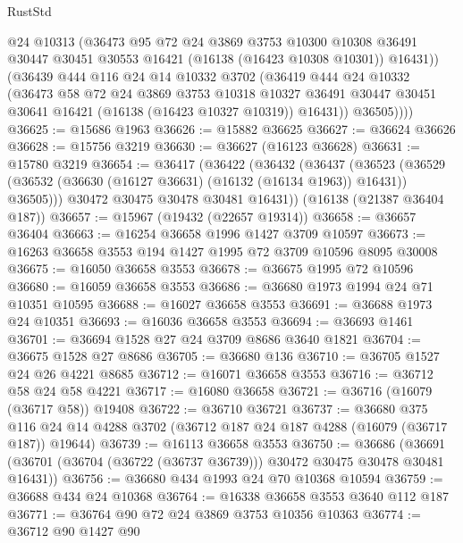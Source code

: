 \begin{lexlean}{RustStd}
\begin{coremodule}
            @24
            @10313
            (@36473
              @95
              @72
              @24
              @3869
              @3753
              @10300
              @10308
              @36491
              @30447
              @30451
              @30553
              @16421
              (@16138 (@16423 @10308 @10301))
              @16431))
          (@36439
            @444
            @116
            @24
            @14
            @10332
            @3702
            (@36419
              @444
              @24
              @10332
              (@36473
                @58
                @72
                @24
                @3869
                @3753
                @10318
                @10327
                @36491
                @30447
                @30451
                @30641
                @16421
                (@16138 (@16423 @10327 @10319))
                @16431))
            @36505))))
@36625 := @15686 @1963
@36626 := @15882 @36625
@36627 := @36624 @36626
@36628 := @15756 @3219
@36630 := @36627 (@16123 @36628)
@36631 := @15780 @3219
@36654 := @36417
    (@36422
      (@36432
        (@36437
          (@36523 (@36529 (@36532 (@36630 (@16127 @36631) (@16132 (@16134 @1963)) @16431)) @36505)))
        @30472
        @30475
        @30478
        @30481
        @16431))
    (@16138 (@21387 @36404 @187))
@36657 := @15967 (@19432 (@22657 @19314))
@36658 := @36657 @36404
@36663 := @16254 @36658 @1996 @1427 @3709 @10597
@36673 := @16263 @36658 @3553 @194 @1427 @1995 @72 @3709 @10596 @8095 @30008
@36675 := @16050 @36658 @3553
@36678 := @36675 @1995 @72 @10596
@36680 := @16059 @36658 @3553
@36686 := @36680 @1973 @1994 @24 @71 @10351 @10595
@36688 := @16027 @36658 @3553
@36691 := @36688 @1973 @24 @10351
@36693 := @16036 @36658 @3553
@36694 := @36693 @1461
@36701 := @36694 @1528 @27 @24 @3709 @8686 @3640 @1821
@36704 := @36675 @1528 @27 @8686
@36705 := @36680 @136
@36710 := @36705 @1527 @24 @26 @4221 @8685
@36712 := @16071 @36658 @3553
@36716 := @36712 @58 @24 @58 @4221
@36717 := @16080 @36658
@36721 := @36716 (@16079 (@36717 @58)) @19408
@36722 := @36710 @36721
@36737 := @36680
    @375
    @116
    @24
    @14
    @4288
    @3702
    (@36712 @187 @24 @187 @4288 (@16079 (@36717 @187)) @19644)
@36739 := @16113 @36658 @3553
@36750 := @36686
    (@36691 (@36701 (@36704 (@36722 (@36737 @36739))) @30472 @30475 @30478 @30481 @16431))
@36756 := @36680 @434 @1993 @24 @70 @10368 @10594
@36759 := @36688 @434 @24 @10368
@36764 := @16338 @36658 @3553 @3640 @112 @187
@36771 := @36764 @90 @72 @24 @3869 @3753 @10356 @10363
@36774 := @36712 @90 @1427 @90

\end{coremodule}
\end{lexlean}
